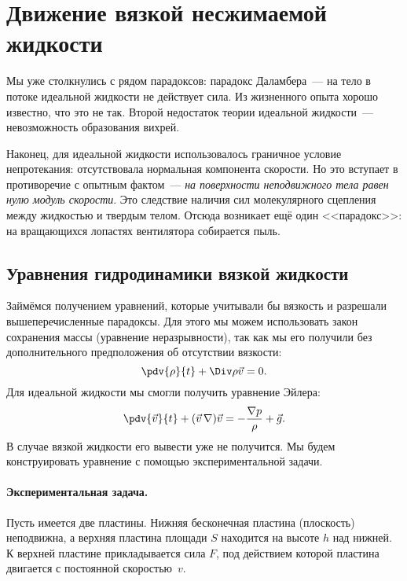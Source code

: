 
\newpage
\section[Движение вязкой несжимаемой жидкости]{Движение вязкой несжимаемой жидкости}

Мы уже столкнулись с рядом парадоксов: парадокс Даламбера~--- на тело в потоке идеальной жидкости не действует сила. Из жизненного опыта хорошо известно, что это не так. Второй недостаток теории идеальной жидкости~--- невозможность образования вихрей.

Наконец, для идеальной жидкости использовалось граничное условие непротекания: отсутствовала нормальная компонента скорости. Но это вступает в противоречие с опытным фактом~--- \textit{на поверхности неподвижного тела равен нулю модуль скорости}. Это следствие наличия сил молекулярного сцепления между жидкостью и твердым телом. Отсюда возникает ещё один <<парадокс>>: на вращающихся лопастях вентилятора собирается пыль.

\subsection{Уравнения гидродинамики вязкой жидкости}
\label{ss:fsev}
Займёмся получением уравнений, которые учитывали бы вязкость и разрешали вышеперечисленные парадоксы. Для этого мы можем использовать закон сохранения массы (уравнение неразрывности), так как мы его получили без дополнительного предположения об отсутствии вязкости:
\begin{equation}
    \pdv{\rho}{t}+\Div \rho \vec{v} = 0.
\end{equation}
Для идеальной жидкости мы смогли получить уравнение Эйлера:
\begin{equation}
    \pdv{\vec{v}}{t}+(\vec{v}\,\nabla)\vec{v} = -\frac{\nabla p}{\rho}+\vec{g}.
\end{equation}
В случае вязкой жидкости его вывести уже не получится. Мы будем конструировать уравнение с помощью экспериментальной задачи.

\paragraph{Экспериментальная задача.} Пусть имеется две пластины. Нижняя бесконечная пластина (плоскость) неподвижна, а верхняя пластина площади $S$ находится на высоте $h$ над нижней. К верхней пластине прикладывается сила $F$, под действием которой пластина двигается с постоянной скоростью~$v$.

